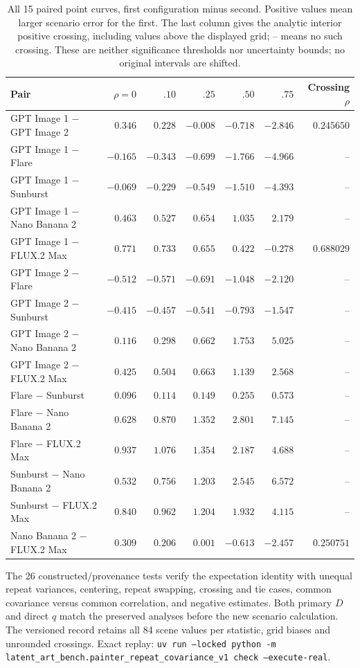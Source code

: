 \begin{table}[!htbp]
\caption{All 15 paired point curves, first configuration minus second. Positive values mean larger scenario error for the first. The last column gives the analytic interior positive crossing, including values above the displayed grid; -- means no such crossing. These are neither significance thresholds nor uncertainty bounds; no original intervals are shifted.}
\label{tab:covariance-pairs}
\centering\small\setlength{\tabcolsep}{4pt}
\begin{tabularx}{\linewidth}{@{}Xrrrrrr@{}}\toprule
Pair & $\rho=0$ & $.10$ & $.25$ & $.50$ & $.75$ & Crossing $\rho$\\\midrule
GPT Image 1 $-$ GPT Image 2 & $0.346$ & $0.228$ & $-0.008$ & $-0.718$ & $-2.846$ & $0.245650$\\
GPT Image 1 $-$ Flare & $-0.165$ & $-0.343$ & $-0.699$ & $-1.766$ & $-4.966$ & --\\
GPT Image 1 $-$ Sunburst & $-0.069$ & $-0.229$ & $-0.549$ & $-1.510$ & $-4.393$ & --\\
GPT Image 1 $-$ Nano Banana 2 & $0.463$ & $0.527$ & $0.654$ & $1.035$ & $2.179$ & --\\
GPT Image 1 $-$ FLUX.2 Max & $0.771$ & $0.733$ & $0.655$ & $0.422$ & $-0.278$ & $0.688029$\\
GPT Image 2 $-$ Flare & $-0.512$ & $-0.571$ & $-0.691$ & $-1.048$ & $-2.120$ & --\\
GPT Image 2 $-$ Sunburst & $-0.415$ & $-0.457$ & $-0.541$ & $-0.793$ & $-1.547$ & --\\
GPT Image 2 $-$ Nano Banana 2 & $0.116$ & $0.298$ & $0.662$ & $1.753$ & $5.025$ & --\\
GPT Image 2 $-$ FLUX.2 Max & $0.425$ & $0.504$ & $0.663$ & $1.139$ & $2.568$ & --\\
Flare $-$ Sunburst & $0.096$ & $0.114$ & $0.149$ & $0.255$ & $0.573$ & --\\
Flare $-$ Nano Banana 2 & $0.628$ & $0.870$ & $1.352$ & $2.801$ & $7.145$ & --\\
Flare $-$ FLUX.2 Max & $0.937$ & $1.076$ & $1.354$ & $2.187$ & $4.688$ & --\\
Sunburst $-$ Nano Banana 2 & $0.532$ & $0.756$ & $1.203$ & $2.545$ & $6.572$ & --\\
Sunburst $-$ FLUX.2 Max & $0.840$ & $0.962$ & $1.204$ & $1.932$ & $4.115$ & --\\
Nano Banana 2 $-$ FLUX.2 Max & $0.309$ & $0.206$ & $0.001$ & $-0.613$ & $-2.457$ & $0.250751$\\
\bottomrule\end{tabularx}\end{table}
\FloatBarrier
The 26 constructed/provenance tests verify the expectation identity with unequal repeat variances, centering, repeat swapping, crossing and tie cases, common covariance versus common correlation, and negative estimates. Both primary $D$ and direct $q$ match the preserved analyses before the new scenario calculation. The versioned record retains all 84 scene values per statistic, grid biases and unrounded crossings. Exact replay: \texttt{uv run --locked python -m latent\_art\_bench.painter\_repeat\_covariance\_v1 check --execute-real}.
